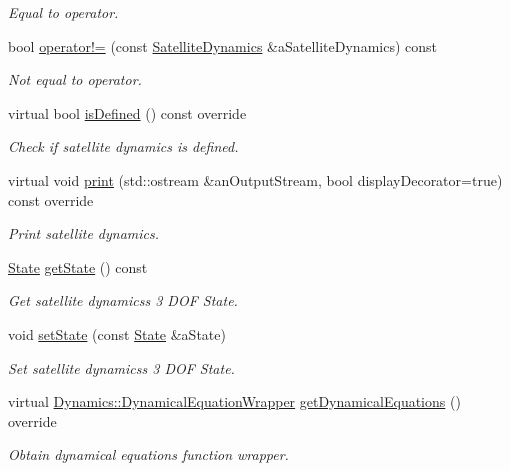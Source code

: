\begin{DoxyCompactItemize}
\begin{DoxyCompactList}\small\item\em Equal to operator. \end{DoxyCompactList}\item 
bool \hyperlink{classostk_1_1astro_1_1flight_1_1system_1_1dynamics_1_1_satellite_dynamics_a0f65a238480359b9baf68ea4b2155eda}{operator!=} (const \hyperlink{classostk_1_1astro_1_1flight_1_1system_1_1dynamics_1_1_satellite_dynamics}{Satellite\+Dynamics} \&a\+Satellite\+Dynamics) const
\begin{DoxyCompactList}\small\item\em Not equal to operator. \end{DoxyCompactList}\item 
virtual bool \hyperlink{classostk_1_1astro_1_1flight_1_1system_1_1dynamics_1_1_satellite_dynamics_aa58384471ec8825964af48a4a2235fab}{is\+Defined} () const override
\begin{DoxyCompactList}\small\item\em Check if satellite dynamics is defined. \end{DoxyCompactList}\item 
virtual void \hyperlink{classostk_1_1astro_1_1flight_1_1system_1_1dynamics_1_1_satellite_dynamics_af60a82bf97622e5b3a670c38ab4ddd32}{print} (std\+::ostream \&an\+Output\+Stream, bool display\+Decorator=true) const override
\begin{DoxyCompactList}\small\item\em Print satellite dynamics. \end{DoxyCompactList}\item 
\hyperlink{classostk_1_1astro_1_1trajectory_1_1_state}{State} \hyperlink{classostk_1_1astro_1_1flight_1_1system_1_1dynamics_1_1_satellite_dynamics_addceb352f6da2de12c1e9fe506533740}{get\+State} () const
\begin{DoxyCompactList}\small\item\em Get satellite dynamics\textquotesingle{}s 3 D\+OF State. \end{DoxyCompactList}\item 
void \hyperlink{classostk_1_1astro_1_1flight_1_1system_1_1dynamics_1_1_satellite_dynamics_a464f46a92c559bf82bc466e7f77195e2}{set\+State} (const \hyperlink{classostk_1_1astro_1_1trajectory_1_1_state}{State} \&a\+State)
\begin{DoxyCompactList}\small\item\em Set satellite dynamics\textquotesingle{}s 3 D\+OF State. \end{DoxyCompactList}\item 
virtual \hyperlink{classostk_1_1astro_1_1flight_1_1system_1_1_dynamics_a9b14f4fbea6fe1e96af9e71545d4c77e}{Dynamics\+::\+Dynamical\+Equation\+Wrapper} \hyperlink{classostk_1_1astro_1_1flight_1_1system_1_1dynamics_1_1_satellite_dynamics_aed9ddda1a1d1c4636e2c0d6ccc9d5a16}{get\+Dynamical\+Equations} () override
\begin{DoxyCompactList}\small\item\em Obtain dynamical equations function wrapper. \end{DoxyCompactList}\end{DoxyCompactItemize}
